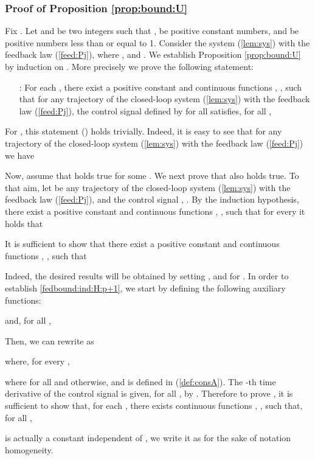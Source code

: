 \documentclass[letterpaper, 10pt]{article}
\newcommand{\rref}[1]{(\ref{#1})}
\begin{document}
\subsubsection{Proof of Proposition \ref{prop:bound:U}}\label{sec:proofprop2}
Fix . Let  and  be two integers such that ,  be positive constant numbers, and  be positive numbers less than or equal to 1. Consider the system \rref{lem:sys} with the feedback law \rref{feed:Pj}, where ,  and . We establish Proposition \ref{prop:bound:U} by induction on . More precisely we prove the following statement:
\begin{itemize}
\item[ :] For each , there exist a positive constant  and continuous functions , , such that for any trajectory  of the closed-loop system \rref{lem:sys} with the feedback law \rref{feed:Pj}, the control signal  defined by  for all  satisfies, for all ,

\end{itemize}

For , this statement () holds trivially. Indeed, it is easy to see that for any trajectory of the closed-loop system \rref{lem:sys} with the feedback law \rref{feed:Pj} we have
 
Now, assume that  holds true for some . We next prove that  also holds true. To that aim, let  be any trajectory of the closed-loop system \rref{lem:sys} with the feedback law \rref{feed:Pj}, and the control signal , . By the induction hypothesis, there exist a positive constant  and continuous functions , , such that for every   it holds that 

It is sufficient to show that there exist a positive constant  and continuous functions , , such that

Indeed, the desired results will be obtained by setting , and  for . In order to establish \eqref{fedbound:ind:H:p+1}, we start by defining the following auxiliary functions: 

and, for all ,

Then, we can rewrite  as 

where, for every ,
 
where  for all  and  otherwise, and  is defined in \rref{def:consA}. The -th time derivative of the control signal  is given, for all , by . Therefore to prove , it is sufficient to show that, for each , there exists continuous functions  , , such that, for all ,

 is actually a constant independent of , we write it as  for the sake of notation homogeneity.
\end{document}
